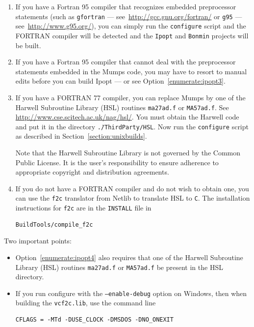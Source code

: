 \documentclass[11pt]{article}
\renewcommand{\_}{{\char"5F}}
\renewcommand{\{}{{\char"7B}}
\renewcommand{\}}{{\char"7D}}
\renewcommand{\^}{{\char"0D}}
\renewcommand{\'}{{\char"0D}}
\newif\ifipopt  \ipopttrue      %
\begin{document}
\begin{enumerate}[{Option} 1.]

\item{}   If you \ifipopt\else are building in a Unix-like environment and \fi have a Fortran 95 compiler that 
recognizes embedded preprocessor statements (such as {\tt gfortran} --- see~\url{http://gcc.gnu.org/fortran/} 
or {\tt g95} --- see~\url{http://www.g95.org/}), you can simply run the {\tt configure} script and the FORTRAN 
compiler will be detected and the {\tt Ipopt} and {\tt Bonmin} projects will be built.

\item{}   If you have a Fortran 95 compiler that cannot deal with the preprocessor statements embedded in the 
Mumps code,
you may have to resort to manual edits before you can build Ipopt --- or see Option~\ref{enumerate:ipopt3}.

\item{} \label{enumerate:ipopt3} 
If you have a FORTRAN 77 compiler, you can replace Mumps by one of the Harwell Subroutine Library (HSL)%
routines {\tt ma27ad.f} or {\tt MA57ad.f}.  See \url{http://www.cse.scitech.ac.uk/nag/hsl/}.  You must obtain
the Harwell code and put it
in the directory {\tt \../ThirdParty/HSL}.  Now run the {\tt configure} script as described in Section~\ref{section:unixbuilds}.  

Note that the Harwell Subroutine Library is not governed by the Common Public License. It is the user's responsibility
to ensure adherence to appropriate copyright and distribution agreements. 

\item{} \label{enumerate:ipopt4}
If you do not have a FORTRAN compiler and do not wish to obtain one, you can use the {\tt f2c} 
translator from Netlib to translate HSL to {\tt C}.  The installation instructions for {\tt f2c}
are in the {\tt INSTALL} file in
\begin{verbatim}
BuildTools/compile_f2c
\end{verbatim}

\end{enumerate}

\noindent Two important points:


\begin{itemize}
\item Option~\ref{enumerate:ipopt4} also requires that one of the Harwell Subroutine Library (HSL) routines 
{\tt ma27ad.f} or {\tt MA57ad.f} be present in the HSL directory.

\item If you run configure with the {\tt --enable-debug} option on Windows, then when building the {\tt vcf2c.lib}, use the command line

\begin{verbatim}
CFLAGS = -MTd -DUSE_CLOCK -DMSDOS -DNO_ONEXIT
\end{verbatim}

\end{itemize}
\end{document}
